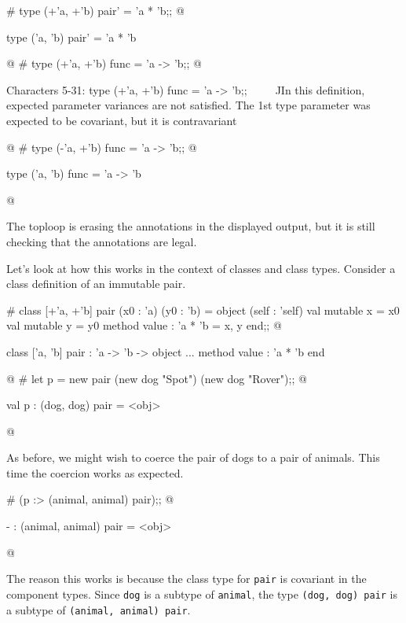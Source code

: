 \begin{ocaml}
# type (+'a, +'b) pair' = 'a * 'b;;
@
\begin{topoutput}
type ('a, 'b) pair' = 'a * 'b
\end{topoutput}
@
# type (+'a, +'b) func = 'a -> 'b;;
@
\begin{toperror}
Characters 5-31:
  type (+'a, +'b) func = 'a -> 'b;;
       ^^^^^^^^^^^^^^^^^^^^^^^^^^
In this definition, expected parameter variances are not satisfied.
The 1st type parameter was expected to be covariant,
but it is contravariant
\end{toperror}
@
# type (-'a, +'b) func = 'a -> 'b;;
@
\begin{topoutput}
type ('a, 'b) func = 'a -> 'b
\end{topoutput}
@
\end{ocaml}
%
The toploop is erasing the annotations in the displayed output, but it
is still checking that the annotations are legal.

Let's look at how this works in the context of classes and class
types.  Consider a class definition of an immutable pair.

\begin{ocaml}
# class [+'a, +'b] pair (x0 : 'a) (y0 : 'b) =
    object (self : 'self)
      val mutable x = x0
      val mutable y = y0
      method value : 'a * 'b = x, y
    end;;
@
\begin{topoutput}
class ['a, 'b] pair : 'a -> 'b -> object ... method value : 'a * 'b end
\end{topoutput}
@
# let p = new pair (new dog "Spot") (new dog "Rover");;
@
\begin{topoutput}
val p : (dog, dog) pair = <obj>
\end{topoutput}
@
\end{ocaml}
%
As before, we might wish to coerce the pair of dogs to a pair of
animals.  This time the coercion works as expected.

\begin{ocaml}
# (p :> (animal, animal) pair);;
@
\begin{topoutput}
- : (animal, animal) pair = <obj>
\end{topoutput}
@
\end{ocaml}
%
The reason this works is because the class type
for \hbox{\lstinline$pair$} is covariant in
the component types.  Since \hbox{\lstinline$dog$} is a subtype
of \hbox{\lstinline$animal$}, the type \hbox{\lstinline$(dog, dog) pair$} is a
subtype of \hbox{\lstinline$(animal, animal) pair$}.

